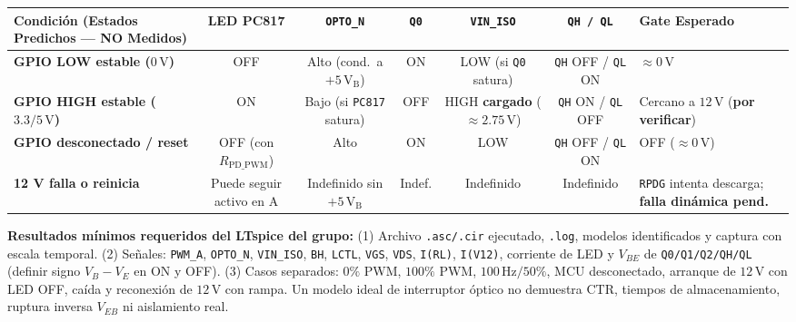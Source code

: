 \documentclass[10pt, a4paper, landscape]{article}
\begin{document}
\par\vspace{0.08cm}\noindent
\renewcommand{\arraystretch}{1.18}
{\footnotesize
\begin{tabularx}{\linewidth}{|>{\raggedright\arraybackslash}p{4.5cm}|c|c|c|c|c|>{\raggedright\arraybackslash}X|}
\hline
\rowcolor{ucbgray}
\textbf{Condición (Estados Predichos — NO Medidos)} & \textbf{LED PC817} & \textbf{\texttt{OPTO\_N}} & \textbf{\texttt{Q0}} & \textbf{\texttt{VIN\_ISO}} & \textbf{\texttt{QH / QL}} & \textbf{Gate Esperado} \\ \hline
\textbf{GPIO LOW estable ($0\,\text{V}$)} & OFF & Alto (cond.\ a $+5\,\text{V}_{\text{B}}$) & ON & LOW (si \texttt{Q0} satura) & \texttt{QH} OFF / \texttt{QL} ON & $\approx 0\,\text{V}$ \\ \hline
\textbf{GPIO HIGH estable ($3.3/5\,\text{V}$)} & ON & Bajo (si \texttt{PC817} satura) & OFF & HIGH \textbf{cargado} ($\approx 2.75\,\text{V}$) & \texttt{QH} ON / \texttt{QL} OFF & Cercano a $12\,\text{V}$ (\textbf{por verificar}) \\ \hline
\textbf{GPIO desconectado / reset} & OFF (con $R_{\text{PD\_PWM}}$) & Alto & ON & LOW & \texttt{QH} OFF / \texttt{QL} ON & OFF ($\approx 0\,\text{V}$) \\ \hline
\textbf{12 V falla o reinicia} & Puede seguir activo en A & Indefinido sin $+5\,\text{V}_{\text{B}}$ & Indef. & Indefinido & Indefinido & \texttt{RPDG} intenta descarga; \textbf{falla dinámica pend.} \\ \hline
\end{tabularx}
}

\vspace{0.1cm}
\noindent
{\footnotesize \textbf{Resultados mínimos requeridos del LTspice del grupo:} (1) Archivo \texttt{.asc/.cir} ejecutado, \texttt{.log}, modelos identificados y captura con escala temporal. (2) Señales: \texttt{PWM\_A}, \texttt{OPTO\_N}, \texttt{VIN\_ISO}, \texttt{BH}, \texttt{LCTL}, \texttt{VGS}, \texttt{VDS}, \texttt{I(RL)}, \texttt{I(V12)}, corriente de LED y $V_{BE}$ de \texttt{Q0/Q1/Q2/QH/QL} (definir signo $V_B - V_E$ en ON y OFF). (3) Casos separados: $0\%$ PWM, $100\%$ PWM, $100\,\text{Hz}/50\%$, MCU desconectado, arranque de $12\,\text{V}$ con LED OFF, caída y reconexión de $12\,\text{V}$ con rampa. Un modelo ideal de interruptor óptico no demuestra CTR, tiempos de almacenamiento, ruptura inversa $V_{EB}$ ni aislamiento real.}
\end{document}
